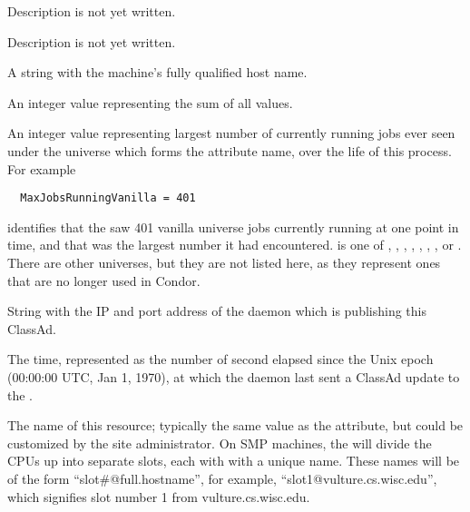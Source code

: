 \begin{description}
\item[\AdAttr{HostsUnclaimed}:] Description is not yet written.

\item[\AdAttr{IdleJobs}:] Description is not yet written.

\item[\AdAttr{Machine}:] A string with the machine's fully qualified 
  host name.

\item[\AdAttr{MaxJobsRunning<universe}:] An integer value representing 
  the sum of all  values.

\item[\AdAttr{MaxJobsRunning<universe>}:] An integer value representing 
  largest number of currently running jobs ever seen
  under the universe which forms the attribute name, 
  over the life of this  process.
  For example
\begin{verbatim}
  MaxJobsRunningVanilla = 401
\end{verbatim}
  identifies that the  saw 401 vanilla universe jobs
  currently running at one point in time, and that was the largest
  number it had encountered.
   is one of 
  , , , ,
  , , , or .
  There are other universes, but they are not listed here, as they represent
  ones that are no longer used in Condor.

\item[\AdAttr{MyAddress}:] String with the IP and port address of the
 daemon which is publishing this ClassAd.

\item[\AdAttr{MyCurrentTime}:]  The time, represented as the number of 
  second elapsed since the Unix epoch (00:00:00 UTC, Jan 1, 1970),
  at which the  daemon last sent a ClassAd update to the
  .

\item[\AdAttr{Name}:] The name of this resource; typically the same value as
  the  attribute, but could be customized by the site
  administrator.
  On SMP machines, the  will divide the CPUs up into separate
  slots, each with with a unique name.
  These names will be of the form ``slot\#@full.hostname'', for example,
  ``slot1@vulture.cs.wisc.edu'', which signifies slot number 1 from
  vulture.cs.wisc.edu.


\end{description}
